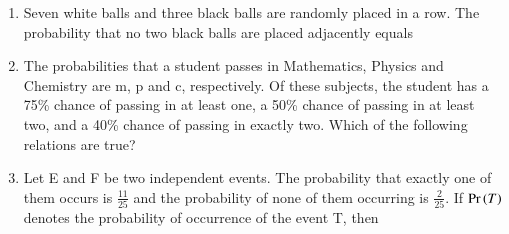 \documentclass[journal,12pt,onecolumn,article]{IEEEtran}
\theoremstyle{remark}
\begin{document}
\begin{enumerate}[start=3]
\begin{enumerate}
\end{enumerate}
\item Seven white balls and three black balls are randomly placed in a row. The probability that no two black balls are placed adjacently equals
\hfill{}
\begin{enumerate}
\end{enumerate}
\item The probabilities that a student passes in Mathematics, Physics and Chemistry are m, p and c, respectively. Of these subjects, the student has a 75\% chance of passing in at least one, a 50\% chance of passing in at least two, and a 40\% chance of passing in exactly two. Which of the following relations are true?
\hfill{}
\begin{enumerate}
\end{enumerate}
\item Let E and F be two independent events. The probability that exactly one of them occurs is $\frac{11}{25}$ and the probability of none of them occurring is $\frac{2}{25}$. If $\Pr\left(T\right)$ denotes the probability of occurrence of the event T, then
\hfill{}
\begin{enumerate}
\end{enumerate}
\end{enumerate}
\end{document}
